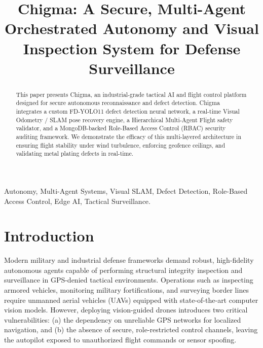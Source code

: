\documentclass[conference]{IEEEtran}
\begin{document}
\title{Chigma: A Secure, Multi-Agent Orchestrated Autonomy and Visual Inspection System for Defense Surveillance}

\author{
\and
{}
}

\maketitle

\begin{abstract}
This paper presents Chigma, an industrial-grade tactical AI and flight control platform designed for secure autonomous reconnaissance and defect detection. Chigma integrates a custom FD-YOLO11 defect detection neural network, a real-time Visual Odometry / SLAM pose recovery engine, a Hierarchical Multi-Agent Flight safety validator, and a MongoDB-backed Role-Based Access Control (RBAC) security auditing framework. We demonstrate the efficacy of this multi-layered architecture in ensuring flight stability under wind turbulence, enforcing geofence ceilings, and validating metal plating defects in real-time.
\end{abstract}

\begin{IEEEkeywords}
Autonomy, Multi-Agent Systems, Visual SLAM, Defect Detection, Role-Based Access Control, Edge AI, Tactical Surveillance.
\end{IEEEkeywords}

\section{Introduction}
Modern military and industrial defense frameworks demand robust, high-fidelity autonomous agents capable of performing structural integrity inspection and surveillance in GPS-denied tactical environments. Operations such as inspecting armored vehicles, monitoring military fortifications, and surveying border lines require unmanned aerial vehicles (UAVs) equipped with state-of-the-art computer vision models. However, deploying vision-guided drones introduces two critical vulnerabilities: (a) the dependency on unreliable GPS networks for localized navigation, and (b) the absence of secure, role-restricted control channels, leaving the autopilot exposed to unauthorized flight commands or sensor spoofing.
\end{document}
